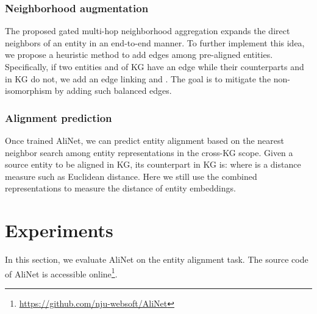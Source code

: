 \documentclass[letterpaper]{article} \usepackage{aaai20}  \usepackage{times}  \usepackage{helvet} \usepackage{courier}  \usepackage[hyphens]{url}  \usepackage{graphicx} \urlstyle{rm} \def\UrlFont{\rm}  \frenchspacing  \setlength{\pdfpagewidth}{8.5in}  \setlength{\pdfpageheight}{11in}  \usepackage{amsmath}
\begin{document}
\subsubsection{Neighborhood augmentation} 
The proposed gated multi-hop neighborhood aggregation expands the direct neighbors of an entity in an end-to-end manner. To further implement this idea, we propose a heuristic method to add edges among pre-aligned entities. Specifically, if two entities  and  of KG have an edge while their counterparts  and  in KG do not, we add an edge linking  and . The goal is to mitigate the non-isomorphism by adding such balanced edges.

\subsubsection{Alignment prediction} Once trained AliNet, we can predict entity alignment based on the nearest neighbor search among entity representations in the cross-KG scope. Given a source entity  to be aligned in KG, its counterpart in KG is: 
where  is a distance measure such as Euclidean distance. Here we still use the combined representations to measure the distance of entity embeddings.

\section{Experiments}
In this section, we evaluate AliNet on the entity alignment task. The source code of AliNet is accessible online\footnote{\url{https://github.com/nju-websoft/AliNet}}.
\end{document}
